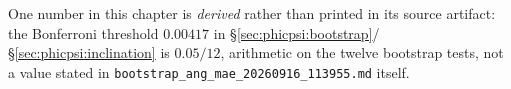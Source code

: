 One number in this chapter is \emph{derived} rather than printed in its source artifact: the Bonferroni threshold $0.00417$ in \S\ref{sec:phicpsi:bootstrap}/\S\ref{sec:phicpsi:inclination} is $0.05/12$, arithmetic on the twelve bootstrap tests, not a value stated in \texttt{bootstrap\_ang\_mae\_20260916\_113955.md} itself.

